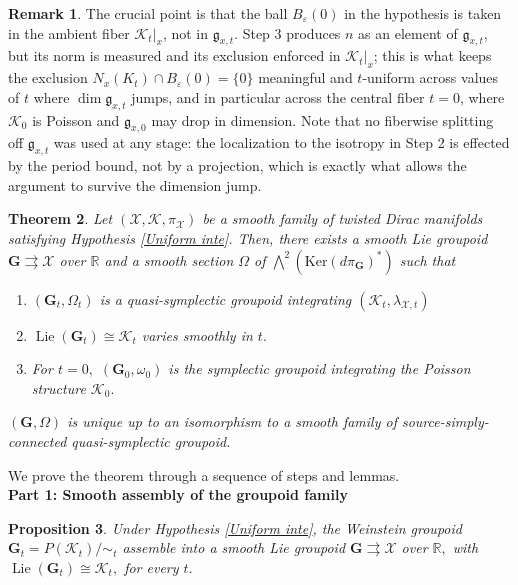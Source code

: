 \documentclass[reqno]{amsart}
\theoremstyle{plain}
\newtheorem{Thm}{Theorem}[section]
\newtheorem{Prop}[Thm]{Proposition}
\theoremstyle{definition}
\newtheorem{Rem}[Thm]{Remark}
\newcommand{\R}{\mathbb{R}}
\newcommand{\X}{\mathcal{X}}
\newcommand{\Kt}{K_t}
\newcommand{\Nx}{N_x(\Kt)}
\newcommand{\Ker}{\text{Ker}}
\newcommand{\K}{\mathcal{K}}
\newcommand{\Lie}{\operatorname{Lie}}
\begin{document}
\begin{Rem}
The crucial point is that the ball $B_\varepsilon(0)$ in the hypothesis is taken in the ambient fiber $\K_t|_x$, not in $\mathfrak{g}_{x,t}$. Step 3 produces $n$ as an element of $\mathfrak{g}_{x,t}$, but its norm is measured
and its exclusion enforced in $\K_t|_x$; this is what keeps the exclusion $\Nx \cap B_\varepsilon(0) = \{0\}$ meaningful and $t$-uniform across values
of $t$ where $\dim\mathfrak{g}_{x,t}$ jumps, and in particular across the central fiber $t=0$, where $\K_0$ is Poisson and $\mathfrak{g}_{x,0}$ may drop
in dimension. Note that no fiberwise splitting off $\mathfrak{g}_{x,t}$ was
used at any stage: the localization to the isotropy in Step 2 is effected by the period bound, not by a projection, which is exactly what allows the argument to survive the dimension jump.
\end{Rem}

\begin{Thm} \label{groupoid integra}
Let $(\X,\K,\pi_{\X})$ be a smooth family of twisted Dirac manifolds satisfying Hypothesis \ref{Uniform inte}. Then, there exists a smooth Lie groupoid $\mathbf{G} \rightrightarrows \X$ over $\R$ and a smooth section $\Omega$ of $\bigwedge^{2} (\Ker(d\pi_{\mathbf{G}})^{*})$ such that \begin{enumerate}
    \item $(\mathbf{G}_t,\Omega_t)$ is a quasi-symplectic groupoid integrating $(\K_t,\lambda_{\X,t})$
    \item $\Lie(\mathbf{G}_t) \cong \K_t$ varies smoothly in $t.$
    \item For $t = 0,$ $(\mathbf{G}_0,\omega_0)$ is the symplectic groupoid integrating the Poisson structure $\K_0.$
\end{enumerate}
$(\mathbf{G},\Omega)$ is unique up to an isomorphism to a smooth family of source-simply-connected quasi-symplectic groupoid.
\end{Thm}

We prove the theorem through a sequence of steps and lemmas.\\



\noindent\textbf{Part 1: Smooth assembly of the groupoid family}
\begin{Prop} \label{integrability prop}
Under Hypothesis \ref{Uniform inte}, the Weinstein groupoid $\mathbf{G}_t = P(\K_t)/\sim_t$ assemble into a smooth Lie groupoid $\mathbf{G} \rightrightarrows \X$ over $\R,$ with $\Lie(\mathbf{G}_t) \cong \K_t,$ for every $t.$    
\end{Prop}
\end{document}
